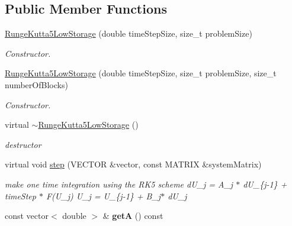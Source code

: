 \subsection*{Public Member Functions}
\begin{DoxyCompactItemize}
\item 
\hyperlink{classnatrium_1_1RungeKutta5LowStorage_add07295826ee6b9f5742ade3233f61b1}{Runge\-Kutta5\-Low\-Storage} (double time\-Step\-Size, size\-\_\-t problem\-Size)
\begin{DoxyCompactList}\small\item\em Constructor. \end{DoxyCompactList}\item 
\hyperlink{classnatrium_1_1RungeKutta5LowStorage_ad65bf4af8362a34f5530bb91bbec67fe}{Runge\-Kutta5\-Low\-Storage} (double time\-Step\-Size, size\-\_\-t problem\-Size, size\-\_\-t number\-Of\-Blocks)
\begin{DoxyCompactList}\small\item\em Constructor. \end{DoxyCompactList}\item 
\hypertarget{classnatrium_1_1RungeKutta5LowStorage_a915493da30cf9308bd47e87d0c20cad8}{virtual \hyperlink{classnatrium_1_1RungeKutta5LowStorage_a915493da30cf9308bd47e87d0c20cad8}{$\sim$\-Runge\-Kutta5\-Low\-Storage} ()}\label{classnatrium_1_1RungeKutta5LowStorage_a915493da30cf9308bd47e87d0c20cad8}

\begin{DoxyCompactList}\small\item\em destructor \end{DoxyCompactList}\item 
\hypertarget{classnatrium_1_1RungeKutta5LowStorage_a595cbb3047387c60507197d78a7ec054}{virtual void \hyperlink{classnatrium_1_1RungeKutta5LowStorage_a595cbb3047387c60507197d78a7ec054}{step} (V\-E\-C\-T\-O\-R \&vector, const M\-A\-T\-R\-I\-X \&system\-Matrix)}\label{classnatrium_1_1RungeKutta5LowStorage_a595cbb3047387c60507197d78a7ec054}

\begin{DoxyCompactList}\small\item\em make one time integration using the R\-K5 scheme d\-U\-\_\-j = A\-\_\-j $\ast$ d\-U\-\_\-\{j-\/1\} + time\-Step $\ast$ F(\-U\-\_\-j) U\-\_\-j = U\-\_\-\{j-\/1\} + B\-\_\-j$\ast$ d\-U\-\_\-j \end{DoxyCompactList}\item 
\hypertarget{classnatrium_1_1RungeKutta5LowStorage_a452fad5bef3b7734c94ca5796ce0c589}{const vector$<$ double $>$ \& {\bfseries get\-A} () const }\label{classnatrium_1_1RungeKutta5LowStorage_a452fad5bef3b7734c94ca5796ce0c589}


\end{DoxyCompactItemize}
